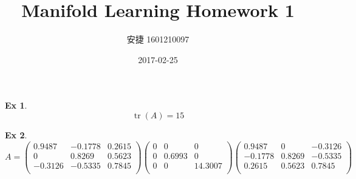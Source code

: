 \documentclass[12pt, oneside]{article}
\title{Manifold Learning Homework 1}
\author{安捷 1601210097}
\date{2017-02-25}
\newtheorem{exercise}{Ex}
\begin{document}
  \maketitle

  \begin{exercise}
	\begin{equation*} 
	  \operatorname{tr}\left(A \right) = 15
	\end{equation*}
  \end{exercise}

  \begin{exercise}
	\begin{equation*}
	  A = 
	  \left( 
	  \begin{array}{ccc}
		0.9487 & -0.1778 & 0.2615 \\
		0 & 0.8269 & 0.5623 \\
		-0.3126 & -0.5335 & 0.7845 \\
	  \end{array}
	  \right)
	  \left( 
	  \begin{array}{ccc}
		0 & 0 & 0 \\
		0 & 0.6993 & 0 \\
		0 & 0 & 14.3007 \\
	  \end{array}
	  \right)
	  \left( 
	  \begin{array}{ccc}
		0.9487 & 0 & -0.3126 \\
		-0.1778 & 0.8269 & -0.5335 \\
		0.2615 & 0.5623 & 0.7845 \\
	  \end{array}
	  \right)
	\end{equation*}
  \end{exercise}
\end{document}
